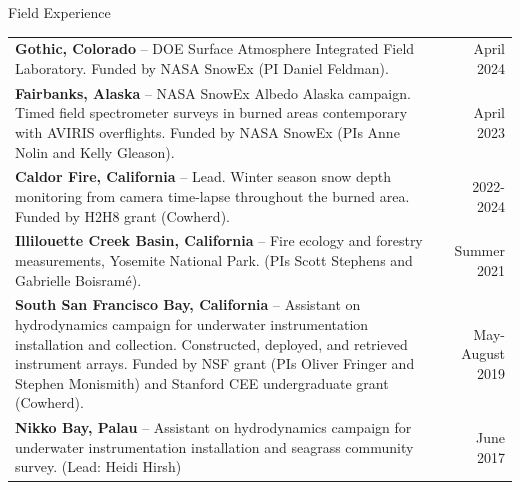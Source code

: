 \documentclass{cv}
\begin{document}
\begin{cSection}{Field Experience}
\renewcommand{\arraystretch}{1.2}
\vspace{1.6em}
\begin{tabularx}{.98\textwidth}{>{\raggedright\arraybackslash}X  r}
\textbf{Gothic, Colorado} -- DOE Surface Atmosphere Integrated Field Laboratory. Funded by NASA SnowEx (PI Daniel Feldman). & April 2024 \\
\textbf{Fairbanks, Alaska} -- NASA SnowEx Albedo Alaska campaign. Timed field spectrometer surveys in burned areas contemporary with AVIRIS overflights. Funded by NASA SnowEx (PIs Anne Nolin and Kelly Gleason). & April 2023 \\
\textbf{Caldor Fire, California} -- Lead. Winter season snow depth monitoring from camera time-lapse throughout the burned area. Funded by H2H8 grant (Cowherd). & 2022-2024\\
\textbf{Illilouette Creek Basin, California} -- Fire ecology and forestry measurements, Yosemite National Park. (PIs Scott Stephens and Gabrielle Boisram\'e). & Summer 2021\\
\textbf{South San Francisco Bay, California} -- Assistant on hydrodynamics campaign for underwater instrumentation installation and collection. Constructed, deployed, and retrieved instrument arrays. Funded by NSF grant (PIs Oliver Fringer and Stephen Monismith) and Stanford CEE undergraduate grant (Cowherd). & May-August 2019 \\
\textbf{Nikko Bay, Palau}  -- Assistant on hydrodynamics campaign for underwater instrumentation installation and seagrass community survey. (Lead: Heidi Hirsh) & June 2017 \\

\end{tabularx}
\end{cSection}
\end{document}
